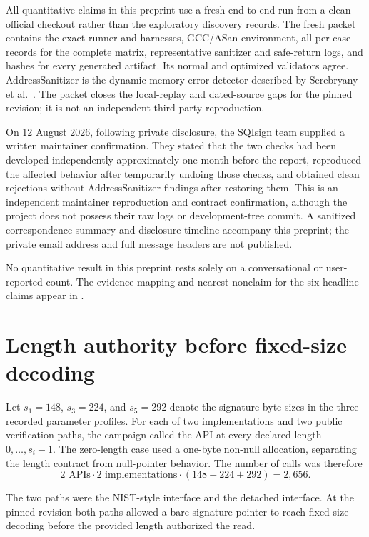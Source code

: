 \documentclass[11pt]{article}
\begin{document}
All quantitative claims in this preprint use a fresh end-to-end run from a
clean official checkout rather than the exploratory discovery records.
The fresh packet contains the exact runner and harnesses, GCC/ASan environment,
all per-case records for the complete matrix, representative sanitizer and
safe-return logs, and hashes for every generated artifact.  Its normal and
optimized validators agree.  AddressSanitizer is the dynamic memory-error
detector described by Serebryany et al.~\cite{asan-paper}.  The packet closes
the local-replay and dated-source gaps for the pinned revision; it is not an
independent third-party reproduction.

On 12 August 2026, following private disclosure, the SQIsign team supplied a
written maintainer confirmation.  They stated that the two checks had been
developed independently approximately one month before the report, reproduced
the affected behavior after temporarily undoing those checks, and obtained
clean rejections without AddressSanitizer findings after restoring them.  This
is an independent maintainer reproduction and contract confirmation, although
the project does not possess their raw logs or development-tree commit.  A
sanitized correspondence summary and disclosure timeline accompany this
preprint; the private email address and full message headers are not published.

No quantitative result in this preprint rests solely on a conversational or
user-reported count.  The evidence mapping and nearest nonclaim for the six
headline claims appear in .

\section{Length authority before fixed-size decoding}

Let $s_1=148$, $s_3=224$, and $s_5=292$ denote the signature byte sizes in the
three recorded parameter profiles.  For each of two implementations and two
public verification paths, the campaign called the API at every declared
length $0,\ldots,s_i-1$.  The zero-length case used a one-byte non-null
allocation, separating the length contract from null-pointer behavior.  The
number of calls was therefore
\[
  2\text{ APIs}\cdot 2\text{ implementations}\cdot
  (148+224+292)=2{,}656.
\]

The two paths were the NIST-style  interface and the
detached  interface.  At the pinned revision both paths
allowed a bare signature pointer to reach fixed-size decoding before the
provided length authorized the read.
\end{document}
